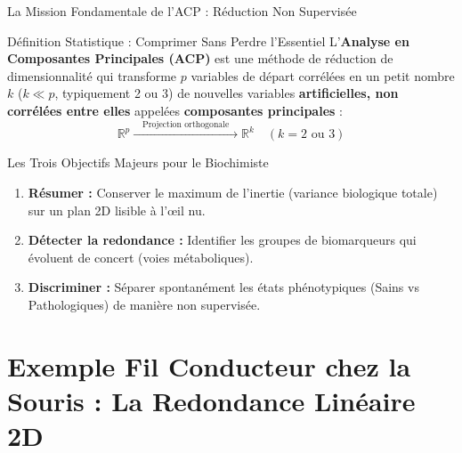 \documentclass[aspectratio=169,10pt]{beamer}
\begin{document}
\begin{frame}{La Mission Fondamentale de l'ACP : Réduction Non Supervisée}
  \begin{conceptbox}{Définition Statistique : Comprimer Sans Perdre l'Essentiel}
    \footnotesize
    L'\textbf{Analyse en Composantes Principales (ACP)} est une méthode de réduction de dimensionnalité qui transforme $p$ variables de départ corrélées en un petit nombre $k$ ($k \ll p$, typiquement 2 ou 3) de nouvelles variables \textbf{artificielles, non corrélées entre elles} appelées \textbf{composantes principales} :
    \begin{equation*}
      \mathbb{R}^p \xrightarrow{\quad \text{Projection orthogonale} \quad} \mathbb{R}^k \quad (k = 2 \text{ ou } 3)
    \end{equation*}
  \end{conceptbox}
  \vspace{1mm}
  \begin{takeawaybox}{Les Trois Objectifs Majeurs pour le Biochimiste}
    \footnotesize
    \begin{enumerate}
      \item \textbf{Résumer :} Conserver le maximum de l'inertie (variance biologique totale) sur un plan 2D lisible à l'œil nu.
      \item \textbf{Détecter la redondance :} Identifier les groupes de biomarqueurs qui évoluent de concert (voies métaboliques).
      \item \textbf{Discriminer :} Séparer spontanément les états phénotypiques (Sains vs Pathologiques) de manière non supervisée.
    \end{enumerate}
  \end{takeawaybox}
\end{frame}

\section{Exemple Fil Conducteur chez la Souris : La Redondance Linéaire 2D}
\end{document}
